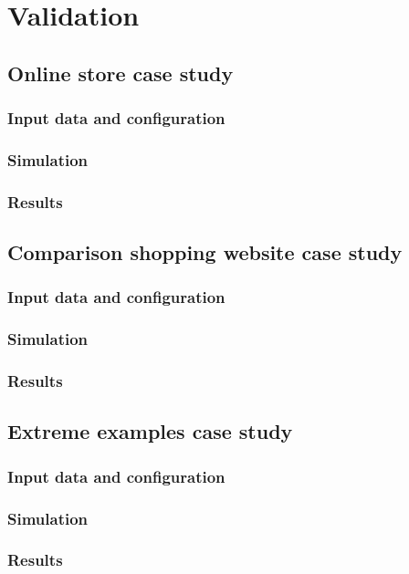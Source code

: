 \chapter{Validation} \label{chap:validation}

\section*{}

\section{Online store case study}

\subsection{Input data and configuration}
\subsection{Simulation}
\subsection{Results}

\section{Comparison shopping website case study}

\subsection{Input data and configuration}
\subsection{Simulation}
\subsection{Results}

\section{Extreme examples case study}

\subsection{Input data and configuration}
\subsection{Simulation}
\subsection{Results}

